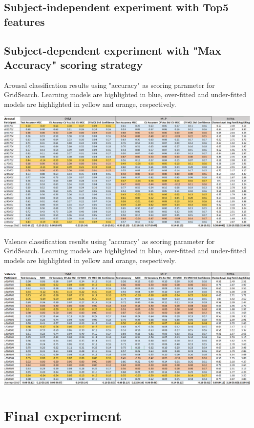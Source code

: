 \subsection{Subject-independent experiment with Top5 features}
\label{sec:appendix_A3.4}

\subsection{Subject-dependent experiment with "Max Accuracy" scoring strategy}
\label{sec:appendix_A3.5}

\begin{table}[h!]
  \caption{Arousal classification results using "accuracy" as scoring parameter for GridSearch. Learning models are highlighted in blue, over-fitted and under-fitted models are highlighted in yellow and orange, respectively.}
  \label{tbl:max_acc_arousal_results}
  \includegraphics[width=\linewidth]{img/appendix/arousal_max_acc_results.png}
\end{table}

\begin{table}[h!]
  \caption{Valence classification results using "accuracy" as scoring parameter for GridSearch. Learning models are highlighted in blue, over-fitted and under-fitted models are highlighted in yellow and orange, respectively.}
  \label{tbl:max_acc_valence_results}
  \includegraphics[width=\linewidth]{img/appendix/valence_max_acc_results.png}
\end{table}


\section{Final experiment}
\label{sec:appendix_A4}



